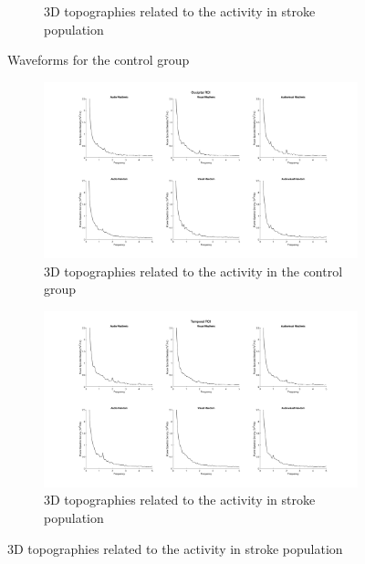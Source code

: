 \begin{figure}[htbp]
\begin{subfigure}[htbp]{0.45\textwidth}
        \caption{3D topographies related to the activity in stroke population}
        \label{fig: Waveforms control: sensorimotor}   
    \end{subfigure}
    \caption{Waveforms for the control group}
    \label{fig: Waveforms control}
\end{figure} 

\begin{figure}[htbp]
    \begin{subfigure}[htbp]{0.55\textwidth}
        \includegraphics[width=\textwidth]{stroke_images/occipital_roi.png}
        \caption{3D topographies related to the activity in the control group}
        \label{fig: Waveforms stroke: occipital} 
    \end{subfigure}  
    \hfill
    \begin{subfigure}[htbp]{0.55\textwidth}
        \includegraphics[width=\textwidth]{stroke_images/temporal_roi.png}
        \caption{3D topographies related to the activity in stroke population}
        \label{fig: Waveforms stroke: temporal}   
    \end{subfigure}
    \vfill

\end{figure}
